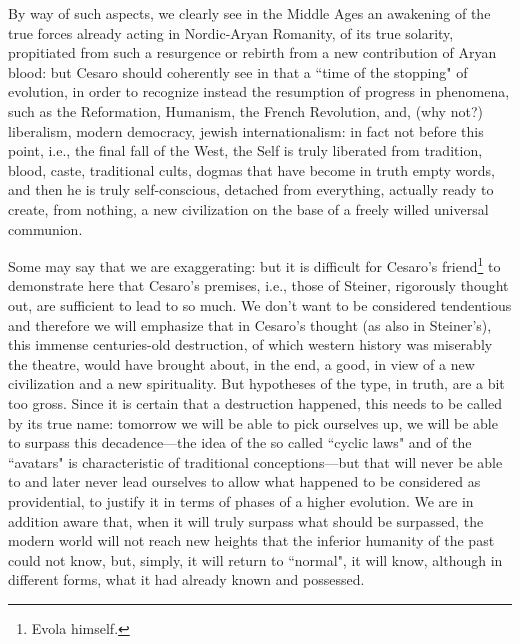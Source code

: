 By way of such aspects, we clearly see in the Middle Ages an awakening of the true forces already acting in Nordic-Aryan Romanity, of its true solarity, propitiated from such a resurgence or rebirth from a new contribution of Aryan blood: but Cesaro should coherently see in that a ``time of the stopping" of evolution, in order to recognize instead the resumption of progress in phenomena, such as the Reformation, Humanism, the French Revolution, and, (why not?) liberalism, modern democracy, jewish internationalism: in fact not before this point, i.e., the final fall of the West, the Self is truly liberated from tradition, blood, caste, traditional cults, dogmas that have become in truth empty words, and then he is truly self-conscious, detached from everything, actually ready to create, from nothing, a new civilization on the base of a freely willed universal communion.

Some may say that we are exaggerating: but it is difficult for Cesaro's friend\footnote{Evola himself.} to demonstrate here that Cesaro's premises, i.e., those of Steiner, rigorously thought out, are sufficient to lead to so much. We don't want to be considered tendentious and therefore we will emphasize that in Cesaro's thought (as also in Steiner's), this immense centuries-old destruction, of which western history was miserably the theatre, would have brought about, in the end, a good, in view of a new civilization and a new spirituality. But hypotheses of the type, in truth, are a bit too gross. Since it is certain that a destruction happened, this needs to be called by its true name: tomorrow we will be able to pick ourselves up, we will be able to surpass this decadence—the idea of the so called ``cyclic laws" and of the ``avatars" is characteristic of traditional conceptions—but that will never be able to and later never lead ourselves to allow what happened to be considered as providential, to justify it in terms of phases of a higher evolution. We are in addition aware that, when it will truly surpass what should be surpassed, the modern world will not reach new heights that the inferior humanity of the past could not know, but, simply, it will return to ``normal", it will know, although in different forms, what it had already known and possessed.

